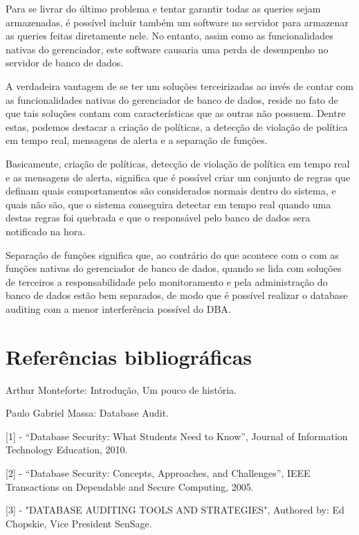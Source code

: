 \documentclass{article}
\begin{document}
Para se livrar do último problema e tentar garantir todas as queries sejam armazenadas, é possível incluir também um software no servidor para armazenar as queries feitas diretamente nele. No entanto, assim como as funcionalidades nativas do gerenciador, este software causaria uma perda de desempenho no servidor de banco de dados. 

A verdadeira vantagem de se ter um soluções terceirizadas ao invés de contar com as funcionalidades nativas do gerenciador de banco de dados, reside no fato de que tais soluções contam com características que as outras não possuem. Dentre estas, podemos destacar a criação de políticas, a detecção de violação de política em tempo real, mensagens de alerta e a separação de funções.

Basicamente, criação de políticas, detecção de violação de política em tempo real e as mensagens de alerta, significa que é possível criar um conjunto de regras que definam quais comportamentos são considerados normais dentro do sistema, e quais não são, que o sistema conseguira detectar em tempo real quando uma destas regras foi quebrada e que o responsável pelo banco de dados sera notificado na hora.

Separação de funções significa que, ao contrário do que acontece com o com as funções nativas do gerenciador de banco de dados, quando se lida com soluções de terceiros a responsabilidade pelo monitoramento e pela administração do banco de dados estão bem separados, de modo que é possível realizar o database auditing com a menor interferência possível do DBA.

\section{Referências bibliográficas}

Arthur Monteforte: Introdução, Um pouco de história.

Paulo Gabriel Massa: Database Audit.


[1] - “Database Security: What Students Need to Know”, Journal of Information Technology Education, 2010.


[2] - “Database Security: Concepts, Approaches, and Challenges”, IEEE Transactions on Dependable and Secure Computing, 2005.


[3] - "DATABASE AUDITING TOOLS AND STRATEGIES", Authored by: Ed Chopskie, Vice President SenSage.
\end{document}
